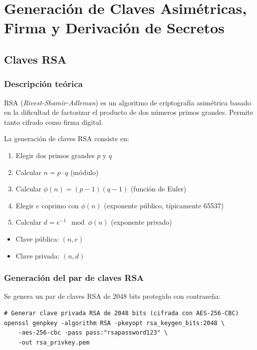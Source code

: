 \chapter{Generación de Claves Asimétricas, Firma y Derivación de Secretos}

\section{Claves RSA}

\subsection{Descripción teórica}

RSA (\textit{Rivest-Shamir-Adleman}) es un algoritmo de criptografía asimétrica basado en la dificultad de factorizar el producto de dos números primos grandes. Permite tanto cifrado como firma digital.

La generación de claves RSA consiste en:

\begin{enumerate}
    \item Elegir dos primos grandes $p$ y $q$
    \item Calcular $n = p \cdot q$ (módulo)
    \item Calcular $\phi(n) = (p-1)(q-1)$ (función de Euler)
    \item Elegir $e$ coprimo con $\phi(n)$ (exponente público, típicamente 65537)
    \item Calcular $d = e^{-1} \mod \phi(n)$ (exponente privado)
\end{enumerate}

\begin{itemize}[label=\textbullet]
    \item Clave pública: $(n, e)$
    \item Clave privada: $(n, d)$
\end{itemize}

\subsection{Generación del par de claves RSA}

Se genera un par de claves RSA de 2048 bits protegido con contraseña:

\begin{lstlisting}[caption=Generación de claves RSA con contraseña]
# Generar clave privada RSA de 2048 bits (cifrada con AES-256-CBC)
openssl genpkey -algorithm RSA -pkeyopt rsa_keygen_bits:2048 \
    -aes-256-cbc -pass pass:"rsapassword123" \
    -out rsa_privkey.pem
\end{lstlisting}


